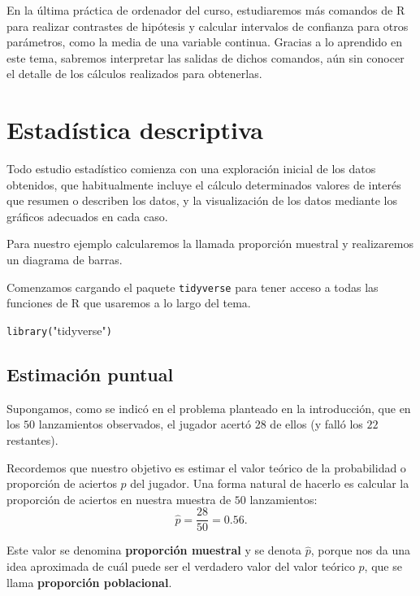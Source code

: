 \documentclass[
  notoc,
  nobib,
  degree=inf]{mnye}
\newenvironment{Shaded}{\begin{snugshade}}{\end{snugshade}}
\newcommand{\FunctionTok}[1]{\textcolor[rgb]{0.00,0.00,0.00}{#1}}
\newcommand{\NormalTok}[1]{#1}
\newcommand{\StringTok}[1]{\textcolor[rgb]{0.31,0.60,0.02}{#1}}
\renewcommand{\FunctionTok}[1]{\textcolor[rgb]{0.13,0.29,0.53}{\texttt{#1}}}
\renewcommand{\NormalTok}[1]{\texttt{#1}}
\begin{document}
En la última práctica de ordenador del curso, estudiaremos más comandos de \textsf{R} para realizar contrastes de hipótesis y calcular intervalos de confianza para otros parámetros, como la media de una variable continua. Gracias a lo aprendido en este tema, sabremos interpretar las salidas de dichos comandos, aún sin conocer el detalle de los cálculos realizados para obtenerlas.

\hypertarget{descriptive}{%
\section{Estadística descriptiva}\label{descriptive}}

Todo estudio estadístico comienza con una exploración inicial de los datos obtenidos, que habitualmente incluye el cálculo determinados valores de interés que resumen o describen los datos, y la visualización de los datos mediante los gráficos adecuados en cada caso.

Para nuestro ejemplo calcularemos la llamada proporción muestral y realizaremos un diagrama de barras.

Comenzamos cargando el paquete \texttt{tidyverse} para tener acceso a todas las funciones de \textsf{R} que usaremos a lo largo del tema.

\begin{Shaded}
\begin{Highlighting}[]
\FunctionTok{library}\NormalTok{(}\StringTok{"tidyverse"}\NormalTok{)}
\end{Highlighting}
\end{Shaded}

\hypertarget{point}{%
\subsection{Estimación puntual}\label{point}}

Supongamos, como se indicó en el problema planteado en la introducción, que en los \(50\) lanzamientos observados, el jugador acertó \(28\) de ellos (y falló los \(22\) restantes).

Recordemos que nuestro objetivo es estimar el valor teórico de la probabilidad o proporción de aciertos \(p\) del jugador. Una forma natural de hacerlo es calcular la proporción de aciertos en nuestra muestra de \(50\) lanzamientos: \[
 \hat{p} = \frac{28}{50} = 0.56.
\]

Este valor se denomina \textbf{proporción muestral} y se denota \(\widehat{p}\), porque nos da una idea aproximada de cuál puede ser el verdadero valor del valor teórico \(p\), que se llama \textbf{proporción poblacional}.
\end{document}

